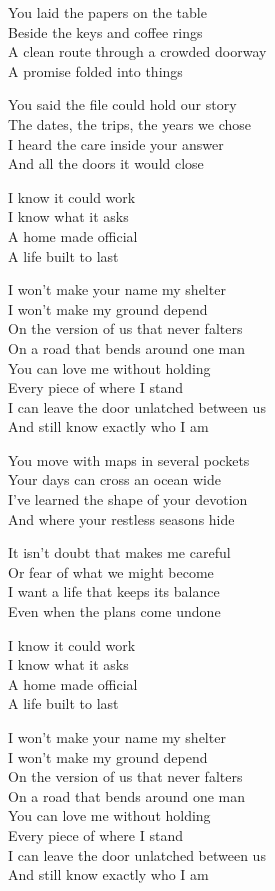 \begin{lyrics}
You laid the papers on the table\\
Beside the keys and coffee rings\\
A clean route through a crowded doorway\\
A promise folded into things

You said the file could hold our story\\
The dates, the trips, the years we chose\\
I heard the care inside your answer\\
And all the doors it would close

I know it could work\\
I know what it asks\\
A home made official\\
A life built to last

I won’t make your name my shelter\\
I won’t make my ground depend\\
On the version of us that never falters\\
On a road that bends around one man\\
You can love me without holding\\
Every piece of where I stand\\
I can leave the door unlatched between us\\
And still know exactly who I am

You move with maps in several pockets\\
Your days can cross an ocean wide\\
I’ve learned the shape of your devotion\\
And where your restless seasons hide

It isn’t doubt that makes me careful\\
Or fear of what we might become\\
I want a life that keeps its balance\\
Even when the plans come undone

I know it could work\\
I know what it asks\\
A home made official\\
A life built to last

I won’t make your name my shelter\\
I won’t make my ground depend\\
On the version of us that never falters\\
On a road that bends around one man\\
You can love me without holding\\
Every piece of where I stand\\
I can leave the door unlatched between us\\
And still know exactly who I am


\end{lyrics}

